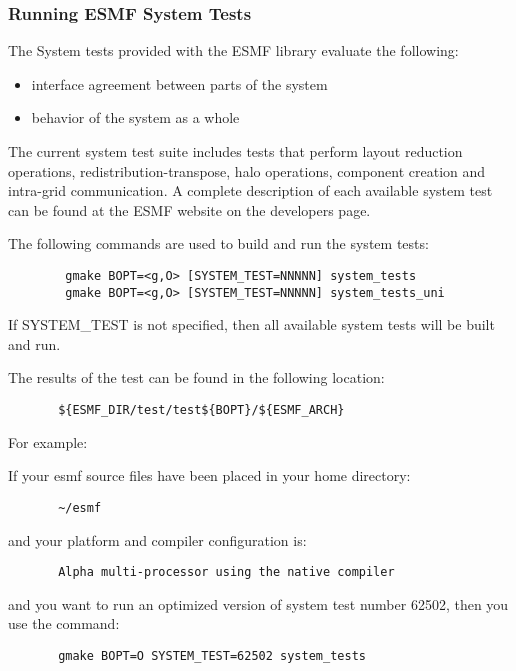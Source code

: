 \subsubsection{Running ESMF System Tests}
\label{SystemTestDescription}

The System tests provided with the ESMF library evaluate the following:
\begin{itemize}
\item interface agreement between parts of the system
\item behavior of the system as a whole
\end{itemize}

The current system test suite includes tests that perform layout reduction operations, redistribution-transpose, halo operations, component creation and intra-grid communication. A complete description of each available system test can be found at the ESMF website on the developers page. 


The following commands are used to build and run the system tests:

\begin{verbatim}
        gmake BOPT=<g,O> [SYSTEM_TEST=NNNNN] system_tests
        gmake BOPT=<g,O> [SYSTEM_TEST=NNNNN] system_tests_uni
\end{verbatim}

If SYSTEM\_TEST is not specified, then all available system tests will be built and run.

The results of the test can be found in the following location:
\begin{verbatim}
       ${ESMF_DIR/test/test${BOPT}/${ESMF_ARCH}
\end{verbatim}

For example: 

If your esmf source files have been placed in your home directory:
\begin{verbatim}
       ~/esmf
\end{verbatim}

and your platform and compiler configuration is:
\begin{verbatim}
       Alpha multi-processor using the native compiler
\end{verbatim}

and you want to run an optimized version of system test number 62502,
then you use the command:
\begin{verbatim}
       gmake BOPT=O SYSTEM_TEST=62502 system_tests
\end{verbatim}

